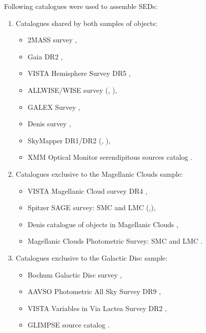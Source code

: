 \documentclass{pracalicmgr}
\begin{document}
Following catalogues were used to assemble SEDs:
\begin{enumerate}
\item Catalogues shared by both samples of objects:
\begin{itemize}
    \item 2MASS survey \citep{skrutskie_two_2006},
    \item Gaia DR2 \citep{gaia_collaboration_gaia_2018},
    \item VISTA Hemisphere Survey DR5 \citep{mcmahon_vizier_2021},
    \item ALLWISE/WISE survey (\citet*{wright_wide-field_2010}, \citet*{cutri_vizier_2021}),
    \item GALEX Survey \citep{bianchi_galex_2011},
    \item Denis survey  \citep{denis_vizier_2005},
    \item SkyMapper DR1/DR2 (\citet*{wolf_skymapper_2018}, \citet*{onken_skymapper_2019}),
    \item XMM Optical Monitor serendipitous sources catalog \citep{page_xmm-newton_2012}.
\end{itemize}
\item Catalogues exclusive to the Magellanic Clouds sample:
\begin{itemize}
    \item VISTA Magellanic Cloud survey DR4 \citep{cioni_vizier_2017},
    \item Spitzer SAGE survey: SMC and LMC (\citet*{meixner_spitzer_2006},\citet*{gordon_surveying_2011}),
    \item Denis catalogue of objects in Magellanic Clouds \citep{cioni_denis_2000},
    \item Magellanic Clouds Photometric Survey: SMC and LMC \citep{zaritsky_magellanic_2002,zaritsky_magellanic_2004}.
\end{itemize}
\item Catalogues exclusive to the Galactic Disc sample:
\begin{itemize}
    \item Bochum Galactic Disc survey \citep{hackstein_bochum_2015},
    \item AAVSO Photometric All Sky Survey DR9 \citep{henden_apass_2015},
    \item VISTA Variables in Via Lactea Survey DR2 \citep{minniti_vizier_2017},
    \item GLIMPSE source catalog \citep{spitzer_science_vizier_2009}.
\end{itemize} 
\end{enumerate}
\end{document}
